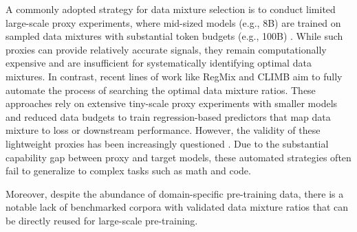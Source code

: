 \documentclass{article}
\newcommand{\cmark}{\textcolor{green!50!black}{\checkmark}} %
\newcommand{\xmark}{\textcolor{red}{\ding{55}}}    %
\theoremstyle{plain}
\theoremstyle{definition}
\theoremstyle{remark}
\begin{document}
A commonly adopted strategy for data mixture selection is to conduct limited large-scale proxy experiments, where mid-sized models (e.g., 8B) are trained on sampled data mixtures with substantial token budgets (e.g., 100B) \cite{li2025minimax, nie2025large, blakeman2025nemotron}. While such proxies can provide relatively accurate signals, they remain computationally expensive and are insufficient for systematically identifying optimal data mixtures. 
In contrast, recent lines of work like RegMix \cite{liu2024regmix} and CLIMB \cite{diao2025climb} aim to fully automate the process of searching the optimal data mixture ratios. 
These approaches rely on extensive tiny-scale proxy experiments with smaller models and reduced data budgets to train regression-based predictors that map data mixture to loss or downstream performance.
However, the validity of these lightweight proxies has been increasingly questioned \cite{allal2025_the_smol_training_playbook_the_secrets_to_building_world_class_llms}.
Due to the substantial capability gap between proxy and target models, these automated strategies often fail to generalize to complex tasks such as math and code.


Moreover, despite the abundance of domain-specific pre-training data, there is a notable lack of benchmarked corpora with validated data mixture ratios that can be directly reused for large-scale pre-training.

\end{document}
